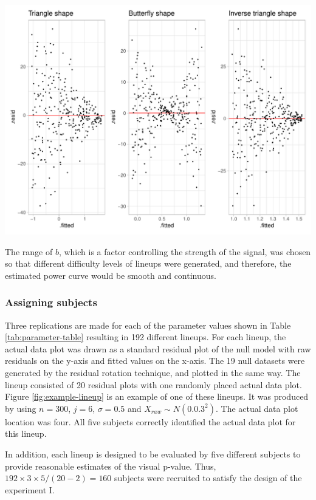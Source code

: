\documentclass[]{interact}
\theoremstyle{plain}%
\theoremstyle{definition}
\theoremstyle{remark}
\begin{document}
\includegraphics[width=1\linewidth]{paper_comparison_files/figure-latex/different-shape-of-heter-1}

The range of \(b\), which is a factor controlling the strength of the
signal, was chosen so that different difficulty levels of lineups were
generated, and therefore, the estimated power curve would be smooth and
continuous.

\hypertarget{assigning-subjects}{%
\subsubsection{Assigning subjects}\label{assigning-subjects}}

Three replications are made for each of the parameter values shown in
Table \ref{tab:parameter-table} resulting in 192 different lineups. For
each lineup, the actual data plot was drawn as a standard residual plot
of the null model with raw residuals on the y-axis and fitted values on
the x-axis. The 19 null datasets were generated by the residual rotation
technique, and plotted in the same way. The lineup consisted of 20
residual plots with one randomly placed actual data plot. Figure
\ref{fig:example-lineup} is an example of one of these lineups. It was
produced by using \(n = 300\), \(j = 6\), \(\sigma = 0.5\) and
\(X_{raw} \sim N(0.0.3^2)\). The actual data plot location was four. All
five subjects correctly identified the actual data plot for this lineup.

In addition, each lineup is designed to be evaluated by five different
subjects to provide reasonable estimates of the visual p-value. Thus,
\(192 \times 3 \times 5 / (20 - 2) = 160\) subjects were recruited to
satisfy the design of the experiment I.
\end{document}
